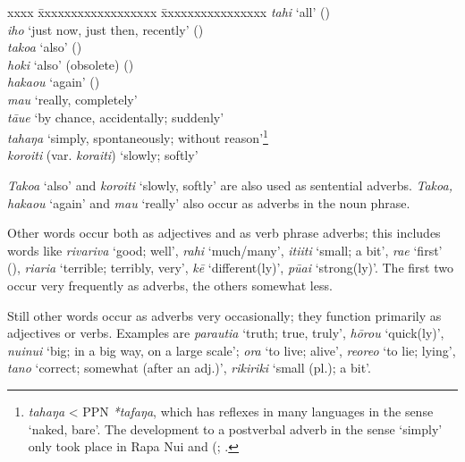 \begin{tabbing}
xxxx \= xxxxxxxxxxxxxxxxxx \= xxxxxxxxxxxxxxxx \kill
\> \textit{tahi} \> ‘all’ ()\\
\> \textit{iho} \> ‘just now, just then, recently’ ()\\
\> \textit{tako{\ꞌ}a} \> ‘also’ ()\\
\> \textit{hoki} \> ‘also’ (obsolete) ()\\
\> \textit{haka{\ꞌ}ou} \> ‘again’ ()\\
\> \textit{mau} \> ‘really, completely’\\
\> \textit{tā{\ꞌ}ue} \> ‘by chance, accidentally; suddenly’\\
\> \textit{tahaŋa} \> ‘simply, spontaneously; without reason’\footnote{\label{fn:190}\textit{tahaŋa} {\textless} PPN \textit{*tafaŋa}, which has reflexes in many languages in the sense ‘naked, bare’. The development to a postverbal adverb in the sense ‘simply’ only took place in Rapa Nui and  (\citealt[180]{Walworth2015Thesis}; \citealt{Walworth2015Classifying}.}\\
\> \textit{koro{\ꞌ}iti} (var. \textit{kora{\ꞌ}iti}) \> ‘slowly; softly’
\end{tabbing}
\textit{Tako{\ꞌ}a} ‘also’ and \textit{koro{\ꞌ}iti} ‘slowly, softly’ are also used as sentential adverbs. \textit{\mbox{Tako{\ꞌ}a}, \mbox{haka{\ꞌ}ou}} ‘again’ and \textit{mau} ‘really’ also occur as adverbs in the noun phrase.

Other words occur both as adjectives and as verb phrase adverbs; this includes words like \textit{rivariva} ‘good; well’, \textit{rahi} ‘much/many’, \textit{{\ꞌ}iti{\ꞌ}iti} ‘small; a bit’, \textit{ra{\ꞌ}e} ‘first’ (), \textit{\mbox{ri{\ꞌ}ari{\ꞌ}a}} ‘terrible; terribly, very’, \textit{kē} ‘different(ly)’, \textit{pūai} ‘strong(ly)’. The first two occur very frequently as adverbs, the others somewhat less.

Still other words occur as adverbs very occasionally; they function primarily as adjectives or verbs. Examples are \textit{parauti{\ꞌ}a} ‘truth; true, truly’, \textit{hōrou} ‘quick(ly)’, \textit{nuinui} ‘big; in a big way, on a large scale’; \textit{ora} ‘to live; alive’, \textit{reoreo} ‘to lie; lying’, \textit{tano} ‘correct; somewhat (after an adj.)’, \textit{rikiriki} ‘small (pl.); a bit’. 

